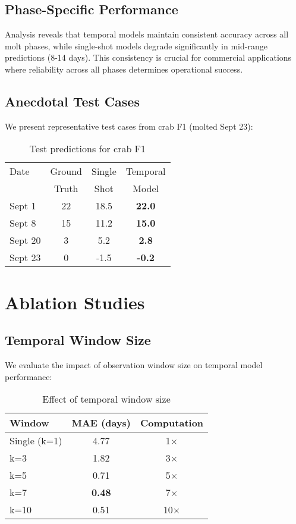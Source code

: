 \documentclass[10pt,twocolumn,letterpaper]{article}
\begin{document}
\subsection{Phase-Specific Performance}

Analysis reveals that temporal models maintain consistent accuracy across all molt phases, while single-shot models degrade significantly in mid-range predictions (8-14 days). This consistency is crucial for commercial applications where reliability across all phases determines operational success.

\subsection{Anecdotal Test Cases}

We present representative test cases from crab F1 (molted Sept 23):

\begin{table}[h]
\centering
\caption{Test predictions for crab F1}
\begin{tabular}{lccc}
\toprule
Date & Ground & Single & Temporal \\
 & Truth & Shot & Model \\
\midrule
Sept 1 & 22 & 18.5 & \textbf{22.0} \\
Sept 8 & 15 & 11.2 & \textbf{15.0} \\
Sept 20 & 3 & 5.2 & \textbf{2.8} \\
Sept 23 & 0 & -1.5 & \textbf{-0.2} \\
\bottomrule
\end{tabular}
\end{table}

\section{Ablation Studies}

\subsection{Temporal Window Size}
We evaluate the impact of observation window size on temporal model performance:

\begin{table}[h]
\centering
\caption{Effect of temporal window size}
\begin{tabular}{lcc}
\toprule
Window & MAE (days) & Computation \\
\midrule
Single (k=1) & 4.77 & 1× \\
k=3 & 1.82 & 3× \\
k=5 & 0.71 & 5× \\
k=7 & \textbf{0.48} & 7× \\
k=10 & 0.51 & 10× \\
\bottomrule
\end{tabular}
\end{table}
\end{document}
